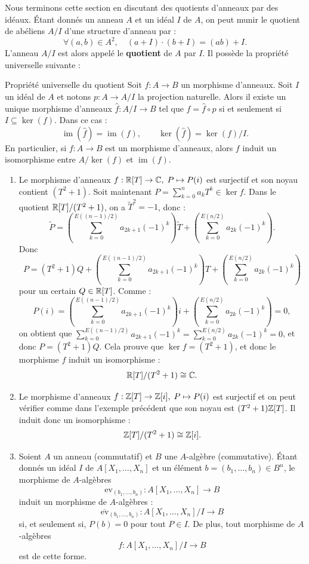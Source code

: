 \documentclass[]{report}
\begin{document}
Nous terminons cette section en discutant des quotients d'anneaux par des idéaux. Étant donnés un anneau $A$ et un idéal $I$ de $A$, on peut munir le quotient de \grs abéliens $A/I$ d'une structure d'anneau par :
\[\forall (a, b) \in A^2, \quad (a + I) \cdot (b + I) = (ab) + I.\]
L'anneau $A/I$ est alors appelé le \textbf{quotient} de $A$ par $I$. Il possède la propriété universelle suivante :

\begin{tm}{Propriété universelle du quotient}{}
    Soit $f : A \to B$ un morphisme d'anneaux. Soit $I$ un idéal de $A$ et notons $p : A \to A/I$ la projection naturelle. Alors il existe un unique morphisme d'anneaux $\hat{f} : A/I \to B$ tel que $f = \hat{f} \circ p$ si et seulement si $I \subseteq \ker(f)$. Dans ce cas :
    \[\operatorname{im}(\hat{f}) = \operatorname{im}(f), \qquad \ker(\hat{f}) = \ker(f)/I.\]
    En particulier, si $f : A \to B$ est un morphisme d'anneaux, alors $f$ induit un isomorphisme entre $A/\ker(f)$ et $\operatorname{im}(f)$.
\end{tm}

\begin{ex}{}{}
    \begin{enumerate}
        \item Le morphisme d'anneaux $f : \mathbb{R}[T] \to \mathbb{C}, \; P \mapsto P(i)$ est surjectif et son noyau contient $(T^2 + 1)$. Soit maintenant $P = \sum_{k=0}^{n} a_k T^k \in \ker f$. Dans le quotient $\mathbb{R}[T]/(T^2 + 1)$, on a $\tilde{T}^2 = -1$, donc :
        \[\tilde{P} = \left(\sum_{k = 0}^{E((n-1)/2)} a_{2k+1} (-1)^k\right) \tilde{T} + \left(\sum_{k = 0}^{E(n/2)} a_{2k} (-1)^k\right).\]
        Donc
        \[P = (T^2 + 1)Q + \left(\sum_{k = 0}^{E((n-1)/2)} a_{2k+1} (-1)^k\right) T + \left(\sum_{k = 0}^{E(n/2)} a_{2k} (-1)^k\right)\]
        pour un certain $Q \in \mathbb{R}[T]$. Comme :
        \[P(i) = \left(\sum_{k = 0}^{E((n-1)/2)} a_{2k+1} (-1)^k\right) i + \left(\sum_{k = 0}^{E(n/2)} a_{2k} (-1)^k\right) = 0,\]
        on obtient que $\sum_{k=0}^{E((n-1)/2)} a_{2k+1}(-1)^k = \sum_{k=0}^{E(n/2)} a_{2k}(-1)^k = 0$, et donc $P = (T^2 + 1)Q$. Cela prouve que $\ker f = (T^2 + 1)$, et donc le morphisme $f$ induit un isomorphisme :
        \[\mathbb{R}[T]/(T^2 + 1) \cong \mathbb{C}.\]
        \item Le morphisme d'anneaux $f : \mathbb{Z}[T] \to \mathbb{Z}[i], \; P \mapsto P(i)$ est surjectif et on peut vérifier comme dans l'exemple précédent que son noyau est $(T^2 + 1)\mathbb{Z}[T]$. Il induit donc un isomorphisme :
        \[\mathbb{Z}[T]/(T^2 + 1) \cong \mathbb{Z}[i].\]
        \item Soient $A$ un anneau (commutatif) et $B$ une $A$-algèbre (commutative). Étant donnés un idéal $I$ de $A[X_1, \ldots, X_n]$ et un élément $b = (b_1, \ldots, b_n) \in B^n$, le morphisme de $A$-algèbres
        \[\mathrm{ev}_{(b_1, \dots, b_n)} : A[X_1, \dots, X_n] \to B\]
        induit un morphisme de $A$-algèbres :
        \[\overline{\mathrm{ev}}_{(b_1, \dots, b_n)} : A[X_1, \dots, X_n]/I \rightarrow B\]
        si, et seulement si, $P(b) = 0$ pour tout $P \in I$. De plus, tout morphisme de $A$-algèbres
        \[f : A[X_1, \dots, X_n]/I \to B\]
        est de cette forme.
    \end{enumerate}
\end{ex}
\end{document}
